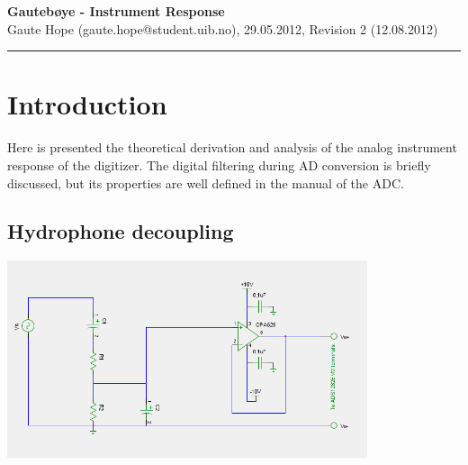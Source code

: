 \documentclass[a4paper]{article}
\newcommand{\makeheading}[2]%
        {\hspace*{-\marginparsep minus \marginparwidth}%
         \begin{minipage}[t]{\textwidth\marginparwidth\marginparsep}%
           {\large \bfseries #1}\\{#2}\\[-0.15\baselineskip]%
                 \rule{\columnwidth}{1pt}%
         \end{minipage}}
\begin{document}
\makeheading{Gautebøye - Instrument Response}{Gaute Hope
(gaute.hope@student.uib.no), 29.05.2012, Revision 2 (12.08.2012)}

\vspace{2em}
\section*{Introduction}
Here is presented the theoretical derivation and analysis of the analog
instrument response of the digitizer. The digital filtering during AD
conversion is briefly discussed, but its properties are well defined in
the manual of the ADC\cite{ads1282_ds}. \vspace{2em}

\begin{multicols}{2}
\section{Hydrophone decoupling}
\end{multicols}
\begin{center}
  \includegraphics[width=400px]{Hydrophone_decoupling.png}
  \label{fig:hydrophone_decoupling}
\end{center}
\end{document}
